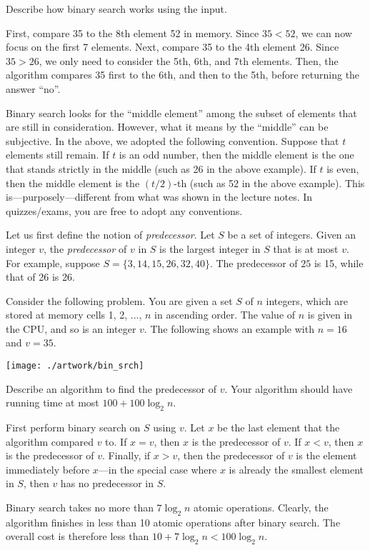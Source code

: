 \noindent Describe how binary search works using the input.

\begin{sol} 
 First, compare 35 to the 8th element 52 in memory. Since $35 < 52$, we can now focus on the first 7 elements. Next, compare 35 to the 4th element 26. Since $35 > 26$, we only need to consider the 5th, 6th, and 7th elements. Then, the algorithm compares 35 first to the 6th, and then to the 5th, before returning the answer ``no''.

 Binary search looks for the ``middle element'' among the subset of elements that are still in consideration. However, what it means by the ``middle'' can be subjective. In the above, we adopted the following convention. Suppose that $t$ elements still remain. If $t$ is an odd number, then the middle element is the one that stands strictly in the middle (such as 26 in the above example). If $t$ is even, then the middle element is the $(t/2)$-th (such as 52 in the above example). This is---purposely---different from what was shown in the lecture notes. In quizzes/exams, you are free to adopt any conventions. 
\end{sol}


 Let us first define the notion of {\em predecessor}. Let $S$ be a set of integers. Given an integer $v$, the {\em predecessor} of $v$ in $S$ is the largest integer in $S$ that is at most $v$. For example, suppose $S = \{3, 14, 15, 26, 32, 40\}$. The predecessor of $25$ is 15, while that of 26 is 26. 

\vgap

Consider the following problem. You are given a set $S$ of $n$ integers, which are stored at memory cells 1, 2, ..., $n$ in ascending order. The value of $n$ is given in the CPU, and so is an integer $v$. The following shows an example with $n = 16$ and $v = 35$. 

\begin{center} 
    \texttt{[image: ./artwork/bin\_srch]}
\end{center}

Describe an algorithm to find the predecessor of $v$. Your algorithm should have running time at most $100 + 100 \log_2 n$. 

\begin{sol} 
 First perform binary search on $S$ using $v$. Let $x$ be the last element that the algorithm compared $v$ to. If $x = v$, then $x$ is the predecessor of $v$. If $x < v$, then $x$ is the predecessor of $v$. Finally, if $x > v$, then the predecessor of $v$ is the element immediately before $x$---in the special case where $x$ is already the smallest element in $S$, then $v$ has no predecessor in $S$. 

\vgap 

Binary search takes no more than $7 \log_2 n$ atomic operations. Clearly, the algorithm finishes in less than 10 atomic operations after binary search. The overall cost is therefore less than $10 + 7\log_2 n < 100 \log_2 n$. 
\end{sol}


